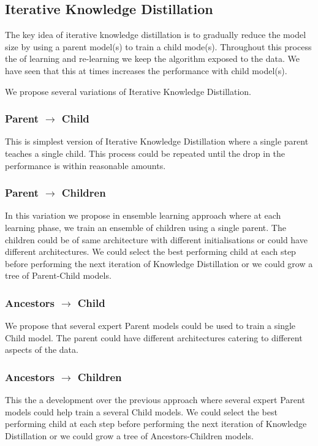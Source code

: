 \documentclass[a4paper,twocolumn]{article}
\begin{document}
\subsection{Iterative Knowledge Distillation}
\label{sec-3-2}
The key idea of iterative knowledge distillation is to gradually reduce the model size by using a parent model(s) to train a child mode(s). Throughout this process the of learning and re-learning we keep the algorithm exposed to the data. We have seen that this at times increases the performance with child model(s).

We propose several variations of Iterative Knowledge Distillation.

\subsubsection*{Parent $\rightarrow$ Child}
\label{sec-3-2-1}
This is simplest version of Iterative Knowledge Distillation where a single parent teaches a single child. This process could be repeated until the drop in the performance is within reasonable amounts.

\subsubsection*{Parent $\rightarrow$ Children}
\label{sec-3-2-2}
In this variation we propose in ensemble learning approach where at each learning phase, we train an ensemble of children using a single parent. The children could be of same architecture with different initialisations or could have different architectures. We could select the best performing child at each step before performing the next iteration of Knowledge Distillation or we could grow a tree of Parent-Child models. 

\subsubsection*{Ancestors $\rightarrow$ Child}
\label{sec-3-2-3}
We propose that several expert Parent models could be used to train a single Child model. The parent could have different architectures catering to different aspects of the data. 

\subsubsection*{Ancestors $\rightarrow$ Children}
\label{sec-3-2-4}
This the a development over the previous approach where several expert Parent models could help train a several Child models. We could select the best performing child at each step before performing the next iteration of Knowledge Distillation or we could grow a tree of Ancestors-Children models.
\end{document}
